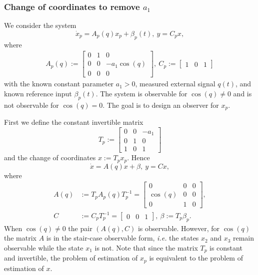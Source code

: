 \subsubsection*{Change of coordinates to remove $a_1$}
We consider the system 
\[
	\dot{x}_p = A_p(q)x_p + \beta_p(t), \ y=C_px,
\]
where
\[
	\begin{aligned}
		A_p(q) := \begin{bmatrix} 0 & 1 &  0\\ 0 & 0 & -a_1\cos(q)\\ 0 & 0 & 0 \end{bmatrix}, \ C_p := \begin{bmatrix} 1 & 0 & 1 \end{bmatrix}
	\end{aligned}
\]
with the known constant parameter $a_1>0$, measured external signal $q(t)$, and known reference input $\beta_p(t)$. The system is observable for $\cos(q)\ne 0$ and is not observable for $\cos(q)=0$. The goal is to design an observer for $x_p$.

First we define the constant invertible matrix
\[
	T_p :=  \begin{bmatrix} 0 & 0 & -a_1 \\ 0 & 1 & 0\\ 1 & 0 & 1 \end{bmatrix}
\]
and the change of coordinates $x := T_p x_p$. Hence
\[
	\dot{x} = A(q)x + \beta, \ y=Cx,
\]
where
\[
	\begin{aligned}
		A(q) &:= T_p A_p(q) T_p^{-1} = 
		\begin{bmatrix} 0 & 0 & 0\\ \cos(q) & 0 & 0\\ 0 & 1 & 0 \end{bmatrix}, \\
		C &:= C_p T_p^{-1} = \begin{bmatrix} 0 & 0 & 1 \end{bmatrix}, \ \beta:=T_p\beta_p.
	\end{aligned}
\]
When $\cos(q)\ne 0$ the pair $\left(A(q),C\right)$ is observable. However, for $\cos(q)$ the matrix $A$ is in the stair-case observable form, \emph{i.e.} the states $x_{2}$ and $x_{3}$ remain observable while the state $x_{1}$ is not. Note that since the matrix $T_p$ is constant and invertible, the problem of estimation of $x_p$ is equivalent to the problem of estimation of $x$.

